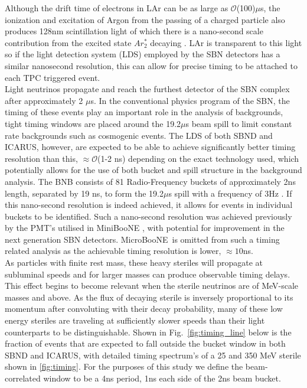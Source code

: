 \documentclass[11pt, a4paper]{article}
\newcommand{\reffig}[1]{Fig.~\ref{#1}}
\def\muboone{MicroBooNE}
\begin{document}
Although the drift time of electrons in LAr can be as large as $\mathcal{O}$(100)$\mu$s, the ionization and excitation of Argon from the passing of a charged particle also produces 128nm scintillation light of which there is a nano-second scale contribution from the excited state $Ar^*_2$ decaying \cite{Acciarri:2015hha}. LAr is transparent to this light so if the light detection system (LDS) employed by the SBN detectors has a similar nanosecond resolution, this can allow for precise timing to be attached to each TPC triggered event.\\

Light neutrinos propagate and reach the furthest detector
of the SBN complex after approximately 2 $\mu$s. In the conventional physics program
of the SBN, the timing of these events play an important role in the analysis
of backgrounds, tight timing windows are placed around the 19.2$\mu$s beam
spill to limit constant rate backgrounds such as cosmogenic events. The LDS of both SBND
and ICARUS, however, are expected to be able to achieve significantly better
timing resolution than this, $\approx \mathcal{O}$(1-2 ns) depending on the exact technology used, which potentially allows for the use of both bucket
and spill structure in the background analysis. The BNB consists of 81
Radio-Frequency buckets of approximately 2ns length, separated by 19 ns, to
form the 19.2$\mu$s spill with a frequency of 3Hz \cite{Antonello:2015lea}.
If this nano-second resolution is indeed achieved, it allows for events in individual buckets to be
identified. Such a nano-second resolution was achieved previously by the PMT's utilised in MiniBooNE \cite{Antonello:2015lea}, with potential for improvement in the next generation SBN detectors. \muboone\ is omitted from such a timing related analysis as the achievable timing
resolution is lower, $\approx 10$ns. \\

As particles with finite rest mass, these heavy steriles will propagate
at subluminal speeds and for larger masses can produce observable timing
delays. This effect begins to become relevant when the sterile neutrinos are of
MeV-scale masses and above. As the flux of decaying sterile is inversely
proportional to its momentum after convoluting with their decay probability, many of these low energy steriles are
traveling at sufficiently slower speeds than their light counterparts to be distinguishable. Shown
in \reffig{fig:timing_line} below is the fraction of events that are expected
to fall outside the  bucket window in both SBND and ICARUS, with detailed
timing spectrum's of a 25 and 350 MeV sterile shown in \ref{fig:timing}. For the purposes of this study we define the beam-correlated window to be a 4ns period, 1ns each side of the 2ns beam bucket.
\end{document}
